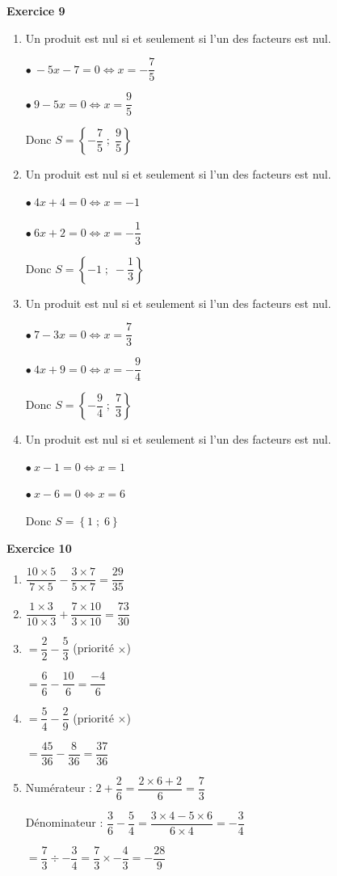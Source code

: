 \documentclass[12pt,a4paper,french]{article}
\begin{document}
\noindent\textbf{Exercice 9}\par
\smallskip
\begin{enumerate}
\item Un produit est nul si et seulement si l'un des facteurs est nul.

$\bullet\ -5x - 7 = 0 \Leftrightarrow x = - \dfrac{7}{5}$

$\bullet\ 9 - 5x = 0 \Leftrightarrow x = \dfrac{9}{5}$

Donc $S = \left\{- \dfrac{7}{5} \; ; \; \dfrac{9}{5}\right\}$

\item Un produit est nul si et seulement si l'un des facteurs est nul.

$\bullet\ 4x + 4 = 0 \Leftrightarrow x = -1$

$\bullet\ 6x + 2 = 0 \Leftrightarrow x = - \dfrac{1}{3}$

Donc $S = \left\{-1 \; ; \; - \dfrac{1}{3}\right\}$

\item Un produit est nul si et seulement si l'un des facteurs est nul.

$\bullet\ 7 - 3x = 0 \Leftrightarrow x = \dfrac{7}{3}$

$\bullet\ 4x + 9 = 0 \Leftrightarrow x = - \dfrac{9}{4}$

Donc $S = \left\{- \dfrac{9}{4} \; ; \; \dfrac{7}{3}\right\}$

\item Un produit est nul si et seulement si l'un des facteurs est nul.

$\bullet\ x - 1 = 0 \Leftrightarrow x = 1$

$\bullet\ x - 6 = 0 \Leftrightarrow x = 6$

Donc $S = \left\{1 \; ; \; 6\right\}$

\end{enumerate}
\medskip

\noindent\textbf{Exercice 10}\par
\smallskip
\begin{enumerate}
\item $\dfrac{10 \times 5}{7 \times 5} - \dfrac{3 \times 7}{5 \times 7} = \dfrac{29}{35}$
\item $\dfrac{1 \times 3}{10 \times 3} + \dfrac{7 \times 10}{3 \times 10} = \dfrac{73}{30}$
\item $= \dfrac{2}{2} - \dfrac{5}{3}$ (priorité $\times$)

$= \dfrac{6}{6} - \dfrac{10}{6} = \dfrac{-4}{6}$
\item $= \dfrac{5}{4} - \dfrac{2}{9}$ (priorité $\times$)

$= \dfrac{45}{36} - \dfrac{8}{36} = \dfrac{37}{36}$
\item Numérateur : $2 + \dfrac{2}{6} = \dfrac{2 \times 6 + 2}{6} = \dfrac{7}{3}$

Dénominateur : $\dfrac{3}{6} - \dfrac{5}{4} = \dfrac{3 \times 4 - 5 \times 6}{6 \times 4} = - \dfrac{3}{4}$

$= \dfrac{7}{3} \div - \dfrac{3}{4} = \dfrac{7}{3} \times - \dfrac{4}{3} = - \dfrac{28}{9}$
\end{enumerate}
\medskip
\end{document}
